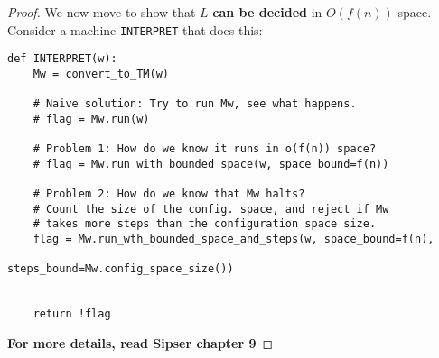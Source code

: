 \begin{proof}
We now move to show that $L$ \textbf{can be decided} in $O(f(n))$ space.
Consider a machine \texttt{INTERPRET} that does this:

\begin{verbatim}
def INTERPRET(w):
    Mw = convert_to_TM(w)

    # Naive solution: Try to run Mw, see what happens.
    # flag = Mw.run(w)

    # Problem 1: How do we know it runs in o(f(n)) space?
    # flag = Mw.run_with_bounded_space(w, space_bound=f(n))

    # Problem 2: How do we know that Mw halts?
    # Count the size of the config. space, and reject if Mw
    # takes more steps than the configuration space size.
    flag = Mw.run_wth_bounded_space_and_steps(w, space_bound=f(n), 
                                                 steps_bound=Mw.config_space_size())


    return !flag
\end{verbatim}
\textbf{For more details, read Sipser chapter 9}
\end{proof}


